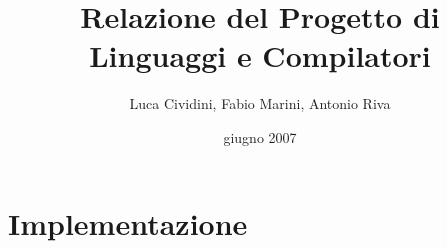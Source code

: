 \documentclass[a4paper,12pt]{book}
\title{Relazione del Progetto di Linguaggi e Compilatori}
\author{Luca Cividini, Fabio Marini, Antonio Riva}
\date{giugno 2007}
\begin{document}
\maketitle %

\tableofcontents %
%



\chapter{Implementazione}






\end{document}
